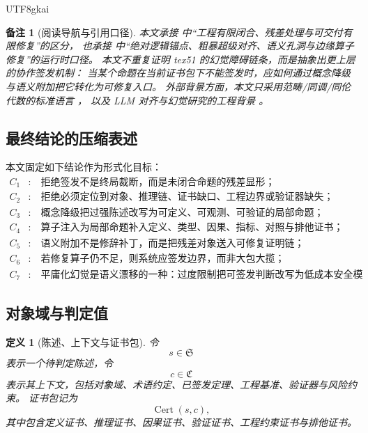 \documentclass[12pt]{article}
\newtheorem{definition}{定义}[section]
\newtheorem{remark}{备注}[section]
\newcommand{\Stmt}{\mathfrak S}
\newcommand{\Ctx}{\mathfrak C}
\newcommand{\Cert}{\operatorname{Cert}}
\begin{document}
\begin{CJK*}{UTF8}{gkai}
\begin{remark}[阅读导航与引用口径]
本文承接 \cite{RepoTex50LinftyRepair} 中“工程有限闭合、残差处理与可交付有限修复”的区分，
也承接 \cite{RepoTex51TruthAnchor} 中“绝对逻辑锚点、粗暴超级对齐、语义孔洞与边缘算子修复”的运行时口径。
本文不重复证明 tex51 的幻觉障碍链条，而是抽象出更上层的协作签发机制：
当某个命题在当前证书包下不能签发时，应如何通过概念降级与语义附加把它转化为可修复入口。
外部背景方面，本文只采用范畴/同调/同伦代数的标准语言 \cite{MacLane1998Categories,Hatcher2002AT,Weibel1994HomologicalAlgebra,LodayVallette2012}，
以及 LLM 对齐与幻觉研究的工程背景 \cite{Christiano2017DeepRLHF,Ouyang2022Training,Bai2022ConstitutionalAI,Ji2023HallucinationSurvey}。
\end{remark}

\subsection{最终结论的压缩表述}
\label{subsec:tex52-final-conclusions}

本文固定如下结论作为形式化目标：
\[
\begin{aligned}
  C_1&:\quad \text{拒绝签发不是终局裁断，而是未闭合命题的残差显形；}\\
  C_2&:\quad \text{拒绝必须定位到对象、推理链、证书缺口、工程边界或验证器缺失；}\\
  C_3&:\quad \text{概念降级把过强陈述改写为可定义、可观测、可验证的局部命题；}\\
  C_4&:\quad \text{算子注入为局部命题补入定义、类型、因果、指标、对照与排他证书；}\\
  C_5&:\quad \text{语义附加不是修辞补丁，而是把残差对象送入可修复证明链；}\\
  C_6&:\quad \text{若修复算子仍不足，则系统应签发边界，而非大包大揽；}\\
  C_7&:\quad \text{平庸化幻觉是语义漂移的一种：过度限制把可签发判断改写为低成本安全模板。}
\end{aligned}
\]

\subsection{对象域与判定值}
\label{subsec:tex52-objects}

\begin{definition}[陈述、上下文与证书包]
令
\[
  s\in\Stmt
\]
表示一个待判定陈述，令
\[
  c\in\Ctx
\]
表示其上下文，包括对象域、术语约定、已签发定理、工程基准、验证器与风险约束。
证书包记为
\[
  \Cert(s,c),
\]
其中包含定义证书、推理证书、因果证书、验证证书、工程约束证书与排他证书。
\end{definition}


\end{CJK*}
\end{document}
